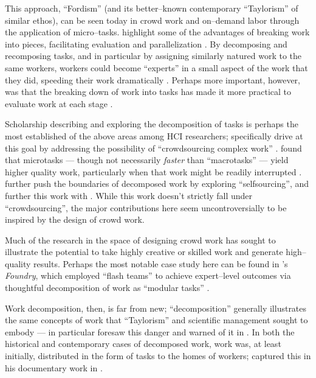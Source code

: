 \documentclass[trackingWork]{subfiles}
\begin{document}
{This approach, ``Fordism'' (and its better--known contemporary ``Taylorism'' of similar ethos),
can be seen today in crowd work and on--demand labor through the application of micro--tasks.
\citeauthor{writingMicroTasks} highlight some of the advantages of breaking work into pieces,
facilitating evaluation and parallelization
\cite{writingMicroTasks}.
By decomposing and recomposing tasks,
and in particular by assigning similarly natured work to the same workers,
workers could become ``experts'' in a small aspect of the work that they did,
speeding their work dramatically
\cite{delayAndOrderLasecki}.
Perhaps more important, however, was that
the breaking down of work into tasks has made it more practical to evaluate work at each stage
\cite{rogstadius2011assessment}.

Scholarship describing and exploring
the decomposition of tasks is perhaps the most established of the above areas among HCI researchers;
\citeauthor{crowdForgeKittur} specifically drive at this goal by addressing the possibility of
``crowdsourcing complex work''
\cite{crowdForgeKittur}.
\citeauthor{cheng2015break} found that microtasks
--- though not necessarily \textit{faster} than ``macrotasks'' ---
yield higher quality work,
particularly when that work might be readily interrupted
\cite{cheng2015break}.
\citeauthor{selfsourcingTeevan2014} further push the boundaries of decomposed work
by exploring ``selfsourcing'', and further this work with \citeauthor{selfsourcingTeevan2016}
\cite{selfsourcingTeevan2014,selfsourcingTeevan2016}.
While this work doesn't strictly fall under ``crowdsourcing'',
the major contributions here
seem uncontroversially to be inspired by the design of crowd work.

Much of the research in the space of designing crowd work has
sought to illustrate the potential to take highly creative or skilled work
and generate high--quality results.
Perhaps the most notable case study here can be found in
\citeauthor{foundry}'s \textit{Foundry}, which employed
``flash teams'' to achieve expert--level outcomes via thoughtful
decomposition of work as ``modular tasks''
\cite{foundry}.

Work decomposition, then, is far from new;
``decomposition'' generally illustrates the same concepts of work that ``Taylorism''
and scientific management sought to embody
---
\citeauthor{professionalCrowdworkEthics} in particular foresaw this danger and warned of it in
\citeyear{professionalCrowdworkEthics}
\cite{crowdworkFuture,professionalCrowdworkEthics,nickerson2013crowd}.
In both the historical and contemporary cases of decomposed work,
work was,
at least initially,
distributed in the form of tasks to the homes of workers;
\citeauthor{riisOtherSideLives} captured this in his documentary work
in \citeyear{riisOtherSideLives}
\cite{riisOtherSideLives}.

}
\end{document}
